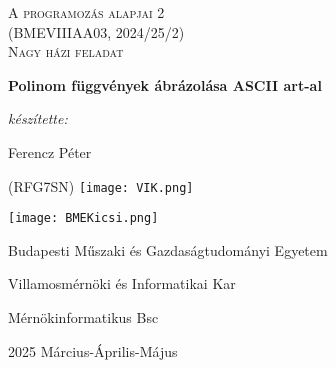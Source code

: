 \begin{titlepage}
    \centering
    \vspace{1cm}
    {\Large \textsc{A programozás alapjai 2\\(BMEVIIIAA03, 2024/25/2)\\  Nagy házi feladat}\par}
    \vspace{1.5cm}
    {\huge\bfseries Polinom függvények ábrázolása ASCII art-al\par}
    \vspace{2cm}
    {\Large\itshape készítette: \par Ferencz Péter\par}
    {\large(RFG7SN)}
    \vfill
    \texttt{[image: VIK.png]}\par
    \vspace{1cm}
    \texttt{[image: BMEKicsi.png]}\par
    Budapesti Műszaki és Gazdaságtudományi Egyetem\par
    Villamosmérnöki és Informatikai Kar\par
    Mérnökinformatikus Bsc\par
    {\large 2025 Március-Április-Május\par}
\end{titlepage}